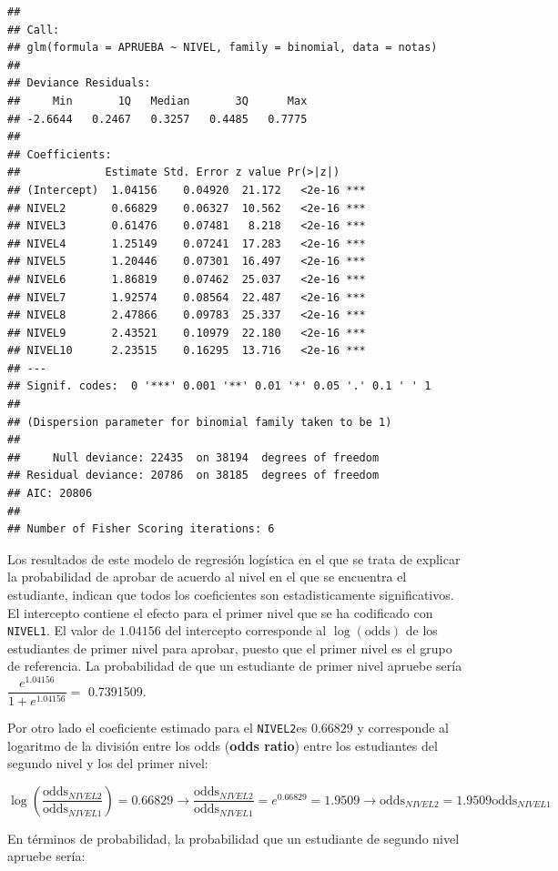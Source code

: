 \documentclass[
]{krantz}
\begin{document}
\begin{verbatim}
## 
## Call:
## glm(formula = APRUEBA ~ NIVEL, family = binomial, data = notas)
## 
## Deviance Residuals: 
##     Min       1Q   Median       3Q      Max  
## -2.6644   0.2467   0.3257   0.4485   0.7775  
## 
## Coefficients:
##             Estimate Std. Error z value Pr(>|z|)    
## (Intercept)  1.04156    0.04920  21.172   <2e-16 ***
## NIVEL2       0.66829    0.06327  10.562   <2e-16 ***
## NIVEL3       0.61476    0.07481   8.218   <2e-16 ***
## NIVEL4       1.25149    0.07241  17.283   <2e-16 ***
## NIVEL5       1.20446    0.07301  16.497   <2e-16 ***
## NIVEL6       1.86819    0.07462  25.037   <2e-16 ***
## NIVEL7       1.92574    0.08564  22.487   <2e-16 ***
## NIVEL8       2.47866    0.09783  25.337   <2e-16 ***
## NIVEL9       2.43521    0.10979  22.180   <2e-16 ***
## NIVEL10      2.23515    0.16295  13.716   <2e-16 ***
## ---
## Signif. codes:  0 '***' 0.001 '**' 0.01 '*' 0.05 '.' 0.1 ' ' 1
## 
## (Dispersion parameter for binomial family taken to be 1)
## 
##     Null deviance: 22435  on 38194  degrees of freedom
## Residual deviance: 20786  on 38185  degrees of freedom
## AIC: 20806
## 
## Number of Fisher Scoring iterations: 6
\end{verbatim}

Los resultados de este modelo de regresión logística en el que se trata de explicar la probabilidad de aprobar de acuerdo al nivel en el que se encuentra el estudiante, indican que todos los coeficientes son estadisticamente significativos. El intercepto contiene el efecto para el primer nivel que se ha codificado con \texttt{NIVEL1}. El valor de \(1.04156\) del intercepto corresponde al \(\log \left( \text{odds} \right)\) de los estudiantes de primer nivel para aprobar, puesto que el primer nivel es el grupo de referencia. La probabilidad de que un estudiante de primer nivel apruebe sería \(\dfrac{e^{1.04156}}{1+e^{1.04156}} =\) 0.7391509.

Por otro lado el coeficiente estimado para el \texttt{NIVEL2}es \(0.66829\) y corresponde al logaritmo de la división entre los odds (\textbf{odds ratio}) entre los estudiantes del segundo nivel y los del primer nivel:

\[\log \left( \dfrac{\text{odds}_{NIVEL2}}{\text{odds}_{NIVEL1}}\right)=0.66829 \rightarrow \dfrac{\text{odds}_{NIVEL2}}{\text{odds}_{NIVEL1}}=e^{0.66829}=1.9509\rightarrow \text{odds}_{NIVEL2} = 1.9509\text{odds}_{NIVEL1}\]

En términos de probabilidad, la probabilidad que un estudiante de segundo nivel apruebe sería:
\end{document}

